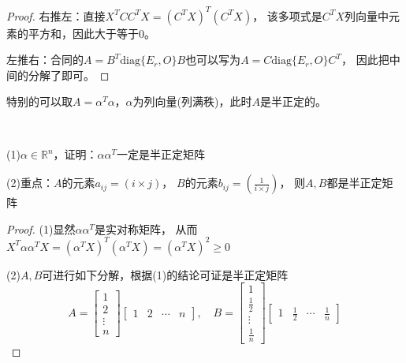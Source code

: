 \begin{proof}
  右推左：直接$X^TCC^TX = (C^TX)^T(C^TX)$，
  该多项式是$C^TX$列向量中元素的平方和，因此大于等于$0$。

  左推右：合同的$A = B^T \mathrm{diag}\{E_r,O\}B$也可以写为$A = C \mathrm{diag}\{E_r,O\}C^T$，
  因此把中间的分解了即可。
\end{proof}

\begin{note}
  特别的可以取$A = \alpha^T \alpha$，$\alpha$为列向量(列满秩)，此时$A$是半正定的。
\end{note}

~

\begin{exercise}[半正定矩阵$CC^T$分解]
  (1)$\alpha \in \mathbb{R}^n$，证明：$\alpha \alpha^T$一定是半正定矩阵

  (2)重点：$A$的元素$a_{ij} = (i \times j)$，
  $B$的元素$b_{ij} = \left( \frac{1}{i \times j} \right)$，
  则$A,B$都是半正定矩阵
\end{exercise}

\begin{proof}
  (1)显然$\alpha\alpha^T$是实对称矩阵，
  从而$X^T\alpha \alpha^TX = (\alpha^TX)^T(\alpha^TX) = (\alpha^TX)^2 \geq 0$

  (2)$A,B$可进行如下分解，根据(1)的结论可证是半正定矩阵
  \begin{equation*}
    A = \left[
      \begin{array}{c}
        1\\
        2\\
        \vdots\\
        n
      \end{array}
    \right] \left[
      \begin{array}{cccc}
        1&2&\cdots&n
      \end{array}
    \right], \quad B = \left[
      \begin{array}{c}
        1\\
        \frac{1}{2}\\
        \vdots\\
        \frac{1}{n}
      \end{array}
    \right] \left[
      \begin{array}{cccc}
        1&\frac{1}{2}&\cdots&\frac{1}{n}
      \end{array}
    \right]
  \end{equation*}
\end{proof}

~

